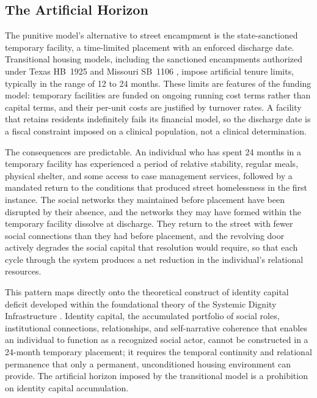 \documentclass[12pt, letterpaper]{article}
\begin{document}
\subsection{The Artificial Horizon}

The punitive model's alternative to street encampment is the state-sanctioned temporary facility, a time-limited placement with an enforced discharge date. Transitional housing models, including the sanctioned encampments authorized under Texas HB~1925 \citep{tx_hb1925_2021} and Missouri SB~1106 \citep{mo_sb1106_2022}, impose artificial tenure limits, typically in the range of 12 to 24 months. These limits are features of the funding model: temporary facilities are funded on ongoing running cost terms rather than capital terms, and their per-unit costs are justified by turnover rates. A facility that retains residents indefinitely fails its financial model, so the discharge date is a fiscal constraint imposed on a clinical population, not a clinical determination.

The consequences are predictable. An individual who has spent 24 months in a temporary facility has experienced a period of relative stability, regular meals, physical shelter, and some access to case management services, followed by a mandated return to the conditions that produced street homelessness in the first instance. The social networks they maintained before placement have been disrupted by their absence, and the networks they may have formed within the temporary facility dissolve at discharge. They return to the street with fewer social connections than they had before placement, and the revolving door actively degrades the social capital that resolution would require, so that each cycle through the system produces a net reduction in the individual's relational resources.

This pattern maps directly onto the theoretical construct of identity capital deficit developed within the foundational theory of the Systemic Dignity Infrastructure \citep{dibella_wp1_2026}. Identity capital, the accumulated portfolio of social roles, institutional connections, relationships, and self-narrative coherence that enables an individual to function as a recognized social actor, cannot be constructed in a 24-month temporary placement; it requires the temporal continuity and relational permanence that only a permanent, unconditioned housing environment can provide. The artificial horizon imposed by the transitional model is a prohibition on identity capital accumulation.
\end{document}
